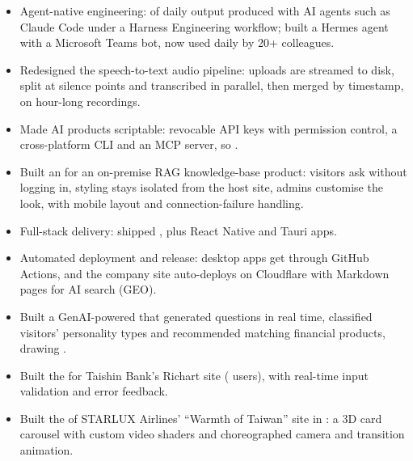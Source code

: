 \documentclass[a4paper]{article}
\begin{document}
\begin{itemize}
  \item Agent-native engineering:  of daily output produced with AI agents such as Claude Code under a Harness Engineering workflow; built a Hermes agent with a Microsoft Teams bot, now used daily by 20+ colleagues.
  \item Redesigned the speech-to-text audio pipeline: uploads are streamed to disk, split at silence points and transcribed in parallel, then merged by timestamp,  on hour-long recordings.
  \item Made AI products scriptable: revocable API keys with permission control, a cross-platform CLI and an MCP server, so .
  \item Built an  for an on-premise RAG knowledge-base product: visitors ask without logging in, styling stays isolated from the host site, admins customise the look, with mobile layout and connection-failure handling.
  \item Full-stack delivery: shipped , plus React Native and Tauri apps.
  \item Automated deployment and release: desktop apps get  through GitHub Actions, and the company site auto-deploys on Cloudflare with Markdown pages for AI search (GEO).
\end{itemize}

\begin{itemize}
  \item Built a GenAI-powered  that generated questions in real time, classified visitors' personality types and recommended matching financial products, drawing .
  \item Built the  for Taishin Bank's Richart site ( users), with real-time input validation and error feedback.
  \item Built the  of STARLUX Airlines' ``Warmth of Taiwan'' site in : a 3D card carousel with custom video shaders and choreographed camera and transition animation.
\end{itemize}
\end{document}

